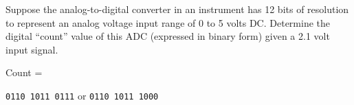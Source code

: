 

Suppose the analog-to-digital converter in an instrument has 12 bits of resolution to represent an analog voltage input range of 0 to 5 volts DC.  Determine the digital ``count'' value of this ADC (expressed in binary form) given a 2.1 volt input signal.

\vskip 10pt

Count = \underbar{\hskip 50pt}

\vskip 10pt







{\tt 0110 1011 0111} \hskip 20pt or \hskip 20pt {\tt 0110 1011 1000}











